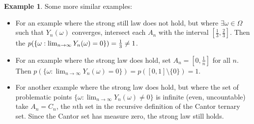 \documentclass[a4paper]{article}
\theoremstyle{definition}
\newtheorem*{example}{Example}
\renewcommand\right\mright%
\renewcommand\left\mleft%
\begin{document}
\begin{example}
Some more similar examples:
  \begin{itemize}
    \item
      For an example where the strong still law does not hold, but where $\exists
      \omega \in \Omega$ such that $Y_n(\omega)$ converges, intersect each $A_n$
      with the interval $[\frac{1}{3},\frac{2}{3}]$. Then the $p\left(
      \{\omega\mathrel{:}\lim_{n\to\infty}Y_n(\omega)=0 \}\right) = \frac{1}{3} \neq
      1$.
    \item
      For an example where the strong law does hold, set $A_n = [0,\frac{1}{n}]$ for
      all $n$. Then $p(\{\omega \mathrel{:}\lim_{n\to\infty} Y_n(\omega)=0\}) =
      p([0,1] \setminus \{0\}  ) = 1$.
    \item
      For another example where the strong law does hold, but where the set of
      problematic points $\{\omega \mathrel{:}\lim_{n\to\infty} Y_n(\omega) \ne 0\}$ is infinite
      (even, uncountable) take $A_n = C_n$, the $n$th set in the recursive
      definition of the Cantor ternary set.  Since the Cantor set has measure zero,
      the strong law still holds.
  \end{itemize}
\end{example}



\nocite{lanchier.n:2017ch1}
\printbibliography[title=References]{}
\end{document}
